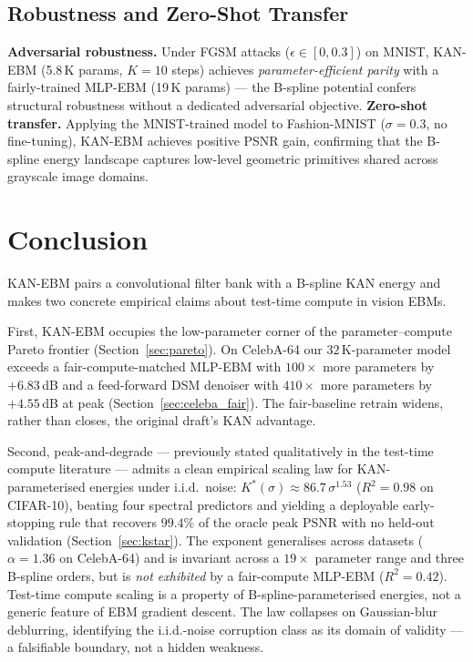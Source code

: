 \documentclass{article}
\begin{document}
\subsection{Robustness and Zero-Shot Transfer}
\label{sec:robustness_transfer}

\textbf{Adversarial robustness.} Under FGSM attacks ($\epsilon{\in}[0,0.3]$) on MNIST,
KAN-EBM (5.8\,K params, $K{=}10$ steps) achieves \emph{parameter-efficient parity}
with a fairly-trained MLP-EBM (19\,K params) — the B-spline potential confers
structural robustness without a dedicated adversarial objective.
\textbf{Zero-shot transfer.} Applying the MNIST-trained model to Fashion-MNIST
($\sigma{=}0.3$, no fine-tuning), KAN-EBM achieves positive PSNR gain, confirming
that the B-spline energy landscape captures low-level geometric primitives shared
across grayscale image domains.

\section{Conclusion}

KAN-EBM pairs a convolutional filter bank with a B-spline KAN energy and makes two
concrete empirical claims about test-time compute in vision EBMs.

First, KAN-EBM occupies the low-parameter corner of the parameter--compute
Pareto frontier (Section~\ref{sec:pareto}). On CelebA-64 our $32$\,K-parameter
model exceeds a fair-compute-matched MLP-EBM with $100\times$ more parameters
by $+6.83$\,dB and a feed-forward DSM denoiser with $410\times$ more parameters
by $+4.55$\,dB at peak (Section~\ref{sec:celeba_fair}). The fair-baseline
retrain widens, rather than closes, the original draft's KAN advantage.

Second, peak-and-degrade --- previously stated qualitatively in the test-time
compute literature --- admits a clean empirical scaling law for
KAN-parameterised energies under i.i.d.\ noise:
$K^{*}(\sigma) \approx 86.7\,\sigma^{1.53}$ ($R^{2}{=}0.98$ on CIFAR-10),
beating four spectral predictors and yielding a deployable early-stopping rule
that recovers $99.4\%$ of the oracle peak PSNR with no held-out validation
(Section~\ref{sec:kstar}). The exponent generalises across datasets
($\alpha{=}1.36$ on CelebA-64) and is invariant across a $19\times$ parameter
range and three B-spline orders, but is \emph{not exhibited} by a
fair-compute MLP-EBM ($R^{2}{=}0.42$). Test-time compute scaling is a
property of B-spline-parameterised energies, not a generic feature of EBM
gradient descent. The law collapses on Gaussian-blur deblurring, identifying
the i.i.d.-noise corruption class as its domain of validity --- a falsifiable
boundary, not a hidden weakness.
\end{document}
